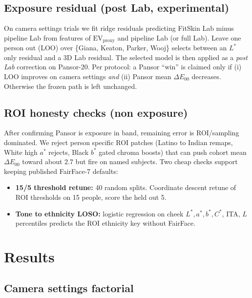 \documentclass[11pt]{article}
\newcommand{\deee}{\ensuremath{\Delta E_{00}}}
\newcommand{\EV}{\mathrm{EV}_{\mathrm{proxy}}}
\begin{document}
\subsection{Exposure residual (post Lab, experimental)}
On camera settings trials we fit ridge residuals predicting FitSkin Lab minus pipeline Lab from features of $\EV$ and pipeline Lab (or full Lab).
Leave one person out (LOO) over \{Giana, Keaton, Parker, Wooj\} selects between an $L^*$ only residual and a 3D Lab residual.
The selected model is then applied as a \emph{post Lab} correction on Pansor-20.
Per protocol: a Pansor ``win'' is claimed only if (i) LOO improves on camera settings \emph{and} (ii) Pansor mean $\deee$ decreases.
Otherwise the frozen path is left unchanged.

\subsection{ROI honesty checks (non exposure)}
After confirming Pansor is exposure in band, remaining error is ROI/sampling dominated.
We reject person specific ROI patches (Latino to Indian remaps, White high $a^*$ rejects, Black $b^*$ gated chroma boosts) that can push cohort mean $\deee$ toward about $2.7$ but fire on named subjects.
Two cheap checks support keeping published FairFace-7 defaults:
\begin{itemize}[leftmargin=*,itemsep=2pt]
  \item \textbf{15/5 threshold retune:} 40 random splits. Coordinate descent retune of ROI thresholds on 15 people, score the held out 5.
  \item \textbf{Tone to ethnicity LOSO:} logistic regression on cheek $L^*,a^*,b^*,C^*$, ITA, $L$ percentiles predicts the ROI ethnicity key without FairFace.
\end{itemize}

\section{Results}

\subsection{Camera settings factorial}
\end{document}
